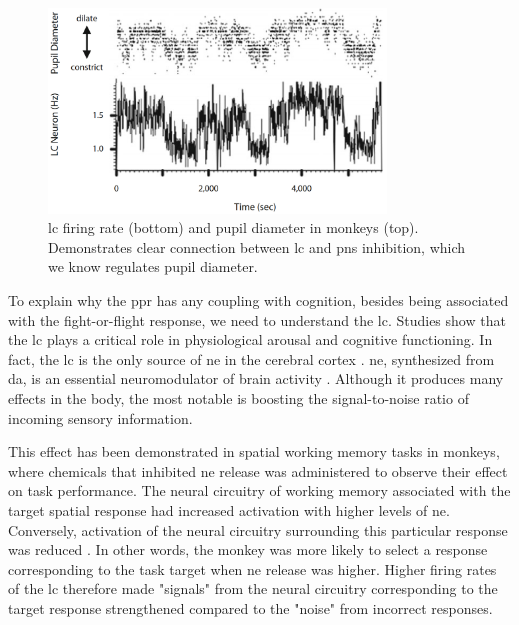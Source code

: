 \begin{figure}[h]
    \centering
    \includegraphics[width=0.8\textwidth]{figures/bt_LC_correlation.png}
    \caption{\acrlong{lc} firing rate (bottom) and pupil diameter in monkeys (top). Demonstrates clear connection between \acrshort{lc} and \acrshort{pns} inhibition, which we know regulates pupil diameter.}
    \label{fig:bt/lc_corr}
\end{figure}

To explain why the \acrshort{ppr} has any coupling with cognition, besides being associated with the fight-or-flight response, we need to understand the \acrlong{lc}. Studies show that the \acrshort{lc} plays a critical role in physiological arousal and cognitive functioning. In fact, the \acrshort{lc} is the only source of \acrfull{ne} in the cerebral cortex \cite{sara2009}. \acrshort{ne}, synthesized from \acrfull{da}, is an essential neuromodulator of brain activity \cite{aminoff2014}. Although it produces many effects in the body, the most notable is boosting the signal-to-noise ratio of incoming sensory information. 

This effect has been demonstrated in spatial working memory tasks in monkeys, where chemicals that inhibited \acrshort{ne} release was administered to observe their effect on task performance. The neural circuitry of working memory associated with the target spatial response had increased activation with higher levels of \acrshort{ne}. Conversely, activation of the neural circuitry surrounding this particular response was reduced \cite{ramos2007}. In other words, the monkey was more likely to select a response corresponding to the task target when \acrshort{ne} release was higher. Higher firing rates of the \acrshort{lc} therefore made "signals" from the neural circuitry corresponding to the target response strengthened compared to the "noise" from incorrect responses.

